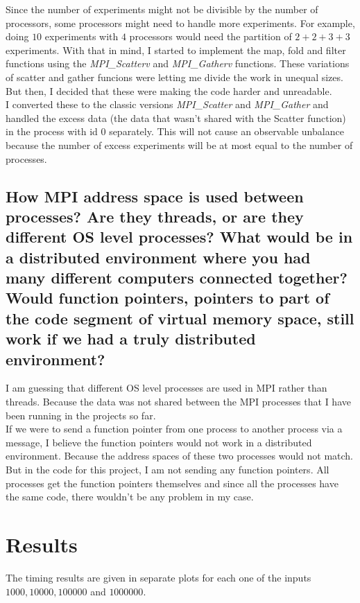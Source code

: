 \documentclass{article}
\begin{document}
Since the number of experiments might not be divisible by the number of processors, some processors might need to handle more experiments. For example, doing $10$ experiments with $4$ processors would need the partition of $2+2+3+3$ experiments. With that in mind, I started to implement the map, fold and filter functions using the \emph{MPI\_Scatterv} and \emph{MPI\_Gatherv} functions. These variations of scatter and gather funcions were letting me divide the work in unequal sizes. But then, I decided that these were making the code harder and unreadable.\\
I converted these to the classic versions \emph{MPI\_Scatter} and \emph{MPI\_Gather} and handled the excess data (the data that wasn't shared with the Scatter function) in the process with id $0$ separately. This will not cause an observable unbalance because the number of excess experiments will be at most equal to the number of processes. 

\subsection{How MPI address space is used between processes? Are they threads, or are they different OS level processes? What would be in a distributed environment where you had many different computers connected together? Would function pointers, pointers to part of the code segment of virtual memory space, still work if we had a truly distributed environment?}

I am guessing that different OS level processes are used in MPI rather than threads. Because the data was not shared between the MPI processes that I have been running in the projects so far. \\
If we were to send a function pointer from one process to another process via a message, I believe the function pointers would not work in a distributed environment. Because the address spaces of these two processes would not match. But in the code for this project, I am not sending any function pointers. All processes get the function pointers themselves and since all the processes have the same code, there wouldn't be any problem in my case.  


\section{Results}

The timing results are given in separate plots for each one of the inputs $1000, 10000, 100000$ and $1000000$.
\end{document}
